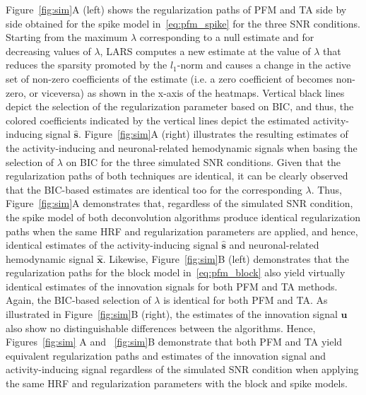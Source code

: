 Figure~\ref{fig:sim}A (left) shows the regularization paths of PFM and TA side by side obtained for the spike model in~\eqref{eq:pfm_spike} for the three SNR conditions. Starting from the maximum $\lambda$ corresponding to a null estimate and for decreasing values of $\lambda$, LARS computes a new estimate at the value of $\lambda$ that reduces the sparsity promoted by the \(l_1\)-norm and causes a change in the active set of non-zero coefficients of the estimate (i.e. a zero coefficient of becomes non-zero, or viceversa) as shown in the x-axis of the heatmaps. Vertical black lines depict the selection of the regularization parameter based on BIC, and thus, the colored coefficients indicated by the vertical lines depict the estimated activity-inducing signal $\mathbf{\hat{{s}}}$. Figure~\ref{fig:sim}A (right) illustrates the resulting estimates of the activity-inducing and neuronal-related hemodynamic signals when basing the selection of $\lambda$ on BIC for the three simulated SNR conditions. Given that the regularization paths of both techniques are identical, it can be clearly observed that the BIC-based estimates are identical too for the corresponding $\lambda$. Thus, Figure~\ref{fig:sim}A demonstrates that, regardless of the simulated SNR condition, the spike model of both deconvolution algorithms produce identical regularization paths when the same HRF and regularization parameters are applied, and hence, identical estimates of the activity-inducing signal $\mathbf{\hat{{s}}}$ and neuronal-related hemodynamic signal $\mathbf{\hat{{x}}}$. 
Likewise, Figure~\ref{fig:sim}B (left) demonstrates that the regularization paths for the block model in~\eqref{eq:pfm_block} also yield virtually identical estimates of the innovation signals for both PFM and TA methods. Again, the BIC-based selection of $\lambda$ is identical for both PFM and TA. As illustrated in Figure~\ref{fig:sim}B (right), the estimates of the innovation signal $\mathbf{u}$ also show no distinguishable differences between the algorithms. Hence, Figures~\ref{fig:sim} A and ~\ref{fig:sim}B demonstrate that both PFM and TA yield equivalent regularization paths and estimates of the innovation signal and activity-inducing signal regardless of the simulated SNR condition when applying the same HRF and regularization parameters with the block and spike models.

